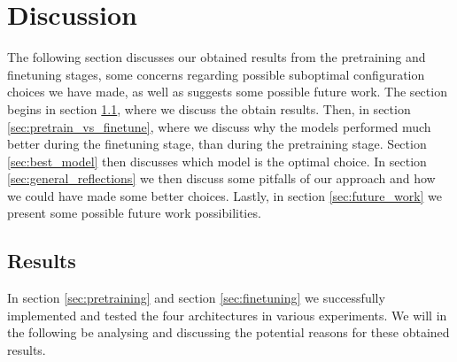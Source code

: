\documentclass[./main.tex]{subfiles}
\begin{document}
\section{Discussion}
\label{sec:discussion}
The following section discusses our obtained results from the pretraining and finetuning stages, some concerns regarding possible suboptimal configuration choices we have made, as well as suggests some possible future work. The section begins in section \ref{sec:results}, where we discuss the obtain results. Then, in section \ref{sec:pretrain_vs_finetune}, where we discuss why the models performed much better during the finetuning stage, than during the pretraining stage. Section \ref{sec:best_model} then discusses which model is the optimal choice. In section \ref{sec:general_reflections} we then discuss some pitfalls of our approach and how we could have made some better choices. Lastly, in section \ref{sec:future_work} we present some possible future work possibilities.

\subsection{Results}
\label{sec:results}
In section \ref{sec:pretraining} and section \ref{sec:finetuning} we successfully implemented and tested the four architectures in various experiments. We will in the following be analysing and discussing the potential reasons for these obtained results.
\end{document}

